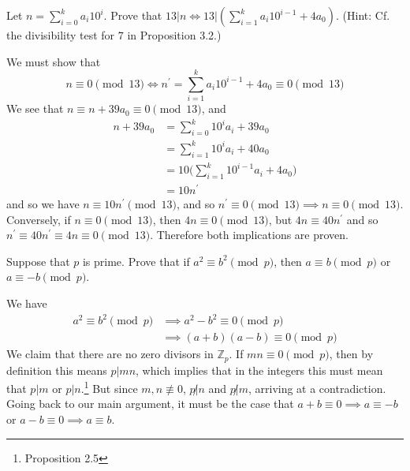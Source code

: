   \begin{exercise}[Shifrin 1.3.10]
    Let $n = \sum_{i=0}^{k} a_i10^i$. Prove that $13|n \iff 13|\left(\sum_{i=1}^{k} a_i10^{i-1} + 4a_0\right)$. (Hint: Cf. the divisibility test for $7$ in Proposition 3.2.)
  \end{exercise}
  \begin{solution}
    We must show that 
    \begin{equation}
      n \equiv 0 \pmod{13} \iff n^\prime = \sum_{i=1}^k a_i 10^{i-1} + 4a_0 \equiv 0 \pmod{13}
    \end{equation} 
    We see that $n \equiv n + 39 a_0 \equiv 0 \pmod{13}$, and 
    \begin{align}
      n + 39 a_0 & = \sum_{i=0}^k 10^i a_i + 39 a_0 \\
                 & = \sum_{i=1}^k 10^i a_i + 40 a_0 \\
                 & = 10 \bigg( \sum_{i=1}^k 10^{i-1} a_i + 4 a_0 \bigg) \\
                 & = 10 n^\prime
    \end{align} 
    and so we have $n \equiv 10 n^\prime \pmod{13}$, and so $n^\prime \equiv 0 \pmod{13} \implies n \equiv 0 \pmod{13}$. Conversely, if $n \equiv 0 \pmod{13}$, then $4n \equiv 0 \pmod{13}$, but $4n \equiv 40 n^\prime$ and so $n^\prime \equiv 40 n^\prime \equiv 4n \equiv 0 \pmod{13}$. Therefore both implications are proven. 
  \end{solution}

  \begin{exercise}[Shifrin 1.3.12]
    Suppose that $p$ is prime. Prove that if $a^2 \equiv b^2 \pmod{p}$, then $a \equiv b \pmod{p}$ or $a \equiv -b \pmod{p}$. 
  \end{exercise}
  \begin{solution}
    We have 
    \begin{align}
      a^2 \equiv b^2 \pmod{p} & \implies a^2 - b^2 \equiv 0 \pmod{p} \\
                              & \implies (a + b) (a - b) \equiv 0 \pmod{p}
    \end{align} 
    We claim that there are no zero divisors in $\mathbb{Z}_p$. If $mn \equiv 0 \pmod{p}$, then by definition this means $p | mn$, which implies that in the integers this must mean that $p | m$ or $p | n$.\footnote{Proposition 2.5} But since $m, n \not\equiv 0$, $p \not| n$ and $p \not| m$, arriving at a contradiction. Going back to our main argument, it must be the case that $a + b \equiv 0 \implies a \equiv -b$ or $a - b \equiv 0 \implies a \equiv b$.  
  \end{solution}

